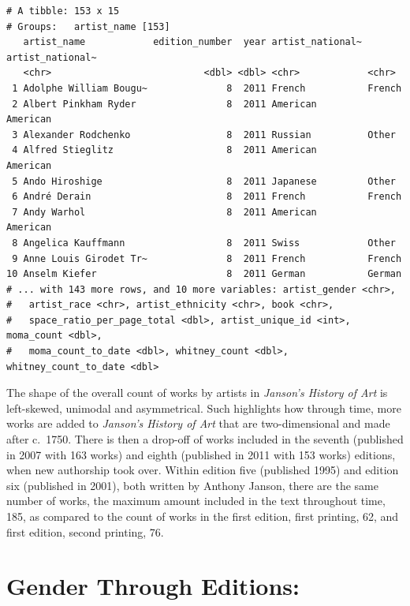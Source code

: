 \documentclass[
  letterpaper,
  DIV=11,
  numbers=noendperiod]{scrreprt}
\begin{document}
\begin{verbatim}
# A tibble: 153 x 15
# Groups:   artist_name [153]
   artist_name            edition_number  year artist_national~ artist_national~
   <chr>                           <dbl> <dbl> <chr>            <chr>           
 1 Adolphe William Bougu~              8  2011 French           French          
 2 Albert Pinkham Ryder                8  2011 American         American        
 3 Alexander Rodchenko                 8  2011 Russian          Other           
 4 Alfred Stieglitz                    8  2011 American         American        
 5 Ando Hiroshige                      8  2011 Japanese         Other           
 6 André Derain                        8  2011 French           French          
 7 Andy Warhol                         8  2011 American         American        
 8 Angelica Kauffmann                  8  2011 Swiss            Other           
 9 Anne Louis Girodet Tr~              8  2011 French           French          
10 Anselm Kiefer                       8  2011 German           German          
# ... with 143 more rows, and 10 more variables: artist_gender <chr>,
#   artist_race <chr>, artist_ethnicity <chr>, book <chr>,
#   space_ratio_per_page_total <dbl>, artist_unique_id <int>, moma_count <dbl>,
#   moma_count_to_date <dbl>, whitney_count <dbl>, whitney_count_to_date <dbl>
\end{verbatim}

The shape of the overall count of works by artists in \emph{Janson's
History of Art} is left-skewed, unimodal and asymmetrical. Such
highlights how through time, more works are added to \emph{Janson's
History of Art} that are two-dimensional and made after c.~1750. There
is then a drop-off of works included in the seventh (published in 2007
with 163 works) and eighth (published in 2011 with 153 works) editions,
when new authorship took over. Within edition five (published 1995) and
edition six (published in 2001), both written by Anthony Janson, there
are the same number of works, the maximum amount included in the text
throughout time, 185, as compared to the count of works in the first
edition, first printing, 62, and first edition, second printing, 76.

\hypertarget{gender-through-editions}{%
\section{\texorpdfstring{\textbf{Gender Through
Editions:}}{Gender Through Editions:}}\label{gender-through-editions}}
\end{document}
